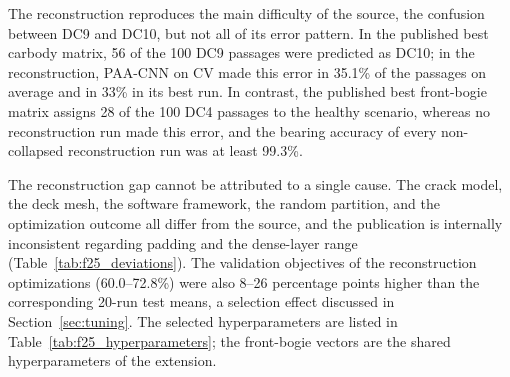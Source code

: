 \begin{table}[htbp]
\centering
\caption{Ten-class test accuracy of the reconstruction over 20 initialization
seeds. SD is the sample standard deviation in percentage points. The last
column gives the accuracy of the best of 20 runs in the source study, computed
from the counts printed in its confusion matrices~\cite{fernandes2025early}.}
\label{tab:f25_reconstruction}
\small

\end{table}

The reconstruction reproduces the main difficulty of the source, the confusion
between DC9 and DC10, but not all of its error pattern. In the published
best carbody matrix, 56 of the 100 DC9 passages were predicted as DC10; in the
reconstruction, PAA-CNN on CV made this error in 35.1\% of the passages on
average and in 33\% in its best run. In contrast, the published best
front-bogie matrix assigns 28 of the 100 DC4 passages to the healthy scenario,
whereas no reconstruction run made this error, and the bearing accuracy of
every non-collapsed reconstruction run was at least 99.3\%.

The reconstruction gap cannot be attributed to a single cause. The crack
model, the deck mesh, the software framework, the random partition, and the
optimization outcome all differ from the source, and the publication is
internally inconsistent regarding padding and the dense-layer range
(Table~\ref{tab:f25_deviations}). The validation objectives of the
reconstruction optimizations (60.0--72.8\%) were also 8--26 percentage points
higher than the corresponding 20-run test means, a selection effect discussed
in Section~\ref{sec:tuning}. The selected hyperparameters are listed in
Table~\ref{tab:f25_hyperparameters}; the front-bogie vectors are the shared
hyperparameters of the extension.

\begin{table}[htbp]
\centering
\caption{Hyperparameters selected by the 100-proposal optimizations for the
reconstruction and for the three channel-specific models on the carbody pitch
rate (CP). Filters are listed per convolutional layer; a superscript $p$ marks
a layer followed by max pooling.}
\label{tab:f25_hyperparameters}
\footnotesize
\setlength{\tabcolsep}{3pt}
\resizebox{\textwidth}{!}{}
\end{table}

